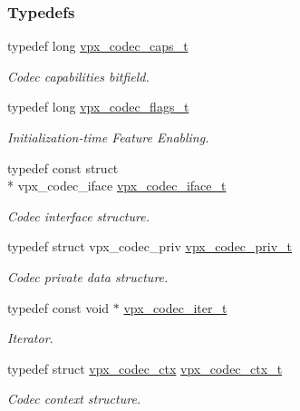 \subsubsection*{Typedefs}
\begin{DoxyCompactItemize}
\item 
typedef long \hyperlink{group__codec_gad2b690c0ef83cbd83a7234078791913f}{vpx\+\_\+codec\+\_\+caps\+\_\+t}
\begin{DoxyCompactList}\small\item\em Codec capabilities bitfield. \end{DoxyCompactList}\item 
typedef long \hyperlink{group__codec_ga3b36d5af89ddc463489fe5bde0a57877}{vpx\+\_\+codec\+\_\+flags\+\_\+t}
\begin{DoxyCompactList}\small\item\em Initialization-\/time Feature Enabling. \end{DoxyCompactList}\item 
typedef const struct \\*
vpx\+\_\+codec\+\_\+iface \hyperlink{group__codec_gae99c3b04f4a567a311211cce3ae6b83b}{vpx\+\_\+codec\+\_\+iface\+\_\+t}
\begin{DoxyCompactList}\small\item\em Codec interface structure. \end{DoxyCompactList}\item 
typedef struct vpx\+\_\+codec\+\_\+priv \hyperlink{group__codec_ga1e262f91be9141a7176335fd409397ab}{vpx\+\_\+codec\+\_\+priv\+\_\+t}
\begin{DoxyCompactList}\small\item\em Codec private data structure. \end{DoxyCompactList}\item 
typedef const void $\ast$ \hyperlink{group__codec_ga6ea348f76b1f8a1fe50e14db684146c6}{vpx\+\_\+codec\+\_\+iter\+\_\+t}
\begin{DoxyCompactList}\small\item\em Iterator. \end{DoxyCompactList}\item 
typedef struct \hyperlink{structvpx__codec__ctx}{vpx\+\_\+codec\+\_\+ctx} \hyperlink{group__codec_gad03e2dfa6ae511db7d25be6bbb336233}{vpx\+\_\+codec\+\_\+ctx\+\_\+t}
\begin{DoxyCompactList}\small\item\em Codec context structure. \end{DoxyCompactList}\end{DoxyCompactItemize}
